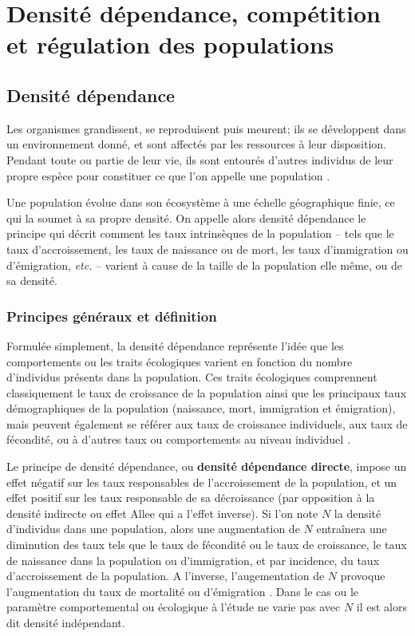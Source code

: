 \section{Densité dépendance,
compétition et régulation des populations}

\subsection{Densité dépendance}

Les organismes grandissent, se reproduisent puis meurent; ils se développent
dans un environnement donné, et sont affectés par les ressources à leur
disposition. Pendant toute ou partie de leur vie, ils sont
entourés d'autres individus de leur propre espèce pour constituer ce que l'on
appelle une population \autocites{begon2009a}. 

Une population évolue dans son écosystème à une échelle géographique finie, ce
qui la soumet à sa propre densité. On appelle alors densité
dépendance le principe qui décrit comment les taux intrinsèques de la
population -- tels que le taux d'accroissement, les taux de naissance ou de
mort, les taux d'immigration ou d'émigration, \textit{etc.} -- varient à cause
de la taille de la population elle même, ou de sa densité.

\subsubsection{Principes généraux et définition}

Formulée simplement, la densité dépendance représente l'idée que les
comportements ou les traits écologiques varient en fonction du nombre
d'individus présents dans la population. Ces traits écologiques comprennent
classiquement le taux de croissance de la population ainsi que les principaux
taux démographiques de la population (naissance, mort, immigration et
émigration), mais peuvent également se référer aux taux de croissance
individuels, aux taux de fécondité, ou à d'autres taux ou comportements au niveau individuel
\autocites{royama1977a}.

Le principe de densité dépendance, ou \textbf{densité dépendance directe},
impose un effet négatif sur les taux responsables de l'accroissement de la population, et
un effet positif sur les taux responsable de sa décroissance (par opposition à
la densité indirecte ou effet Allee qui a l'effet inverse). Si l'on note $N$ la
densité d'individus dans une population, alors une augmentation de $N$
entraînera une diminution des taux tels que le taux de fécondité ou le taux de
croissance, le taux de naissance dans la population ou d'immigration, et par
incidence, du taux d'accroissement de la population. A l'inverse,
l'augementation de $N$ provoque l'augmentation du taux de mortalité ou
d'émigration \autocites{hixon2009a}. Dans le cas ou le paramètre comportemental
ou écologique à l'étude ne varie pas avec $N$ il est alors dit densité
indépendant.

